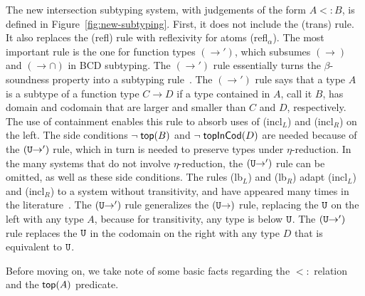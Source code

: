 \documentclass{article}
\begin{document}
The new intersection subtyping system, with judgements of the form $A
<: B$, is defined in Figure~\ref{fig:new-subtyping}. First, it does
not include the (trans) rule.  It also replaces the (refl) rule with
reflexivity for atoms (refl$_\alpha$). The most important rule is the
one for function types $(\to')$, which subsumes $(\to)$ and
$({\to}{\cap})$ in BCD subtyping.  The $(\to')$ rule essentially turns
the $\beta$-soundness property into a subtyping
rule~\citep{Barendregt:2013aa}. The $(\to')$ rule says that a type $A$
is a subtype of a function type $C \to D$ if a type contained in $A$,
call it $B$, has domain and codomain that are larger and smaller than
$C$ and $D$, respectively. The use of containment enables this rule to
absorb uses of (incl$_L$) and (incl$_R$) on the left.  The side
conditions $\neg\;\mathsf{top}(B)$ and $\neg\;\mathsf{topInCod}(D)$ are needed
because of the $(\mathtt{U}{\to}')$ rule, which in turn is needed to
preserve types under $\eta$-reduction.  In the many systems that do
not involve $\eta$-reduction, the $(\mathtt{U}{\to}')$ rule can be omitted,
as well as these side conditions. The rules (lb$_L$) and (lb$_R$)
adapt (incl$_L$) and (incl$_R$) to a system without transitivity, and
have appeared many times in the literature~\citep{Bakel:1995aa}.  The
$(\mathtt{U}{\to}')$ rule generalizes the $(\mathtt{U}{\to})$ rule, replacing the
$\mathtt{U}$ on the left with any type $A$, because for transitivity, any
type is below $\mathtt{U}$. The $(\mathtt{U}{\to}')$ rule replaces the $\mathtt{U}$ in
the codomain on the right with any type $D$ that is equivalent to
$\mathtt{U}$.

Before moving on, we take note of some basic facts regarding the $<:$
relation and the $\mathsf{top}(A)$ predicate.
\end{document}
